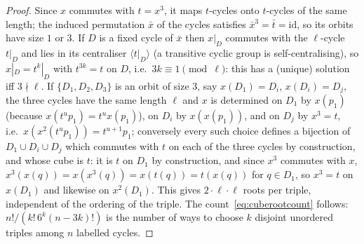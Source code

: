 \begin{proof}
Since $x$ commutes with $t=x^{3}$, it maps $t$-cycles onto $t$-cycles of the same length; the induced permutation $\bar x$ of the cycles satisfies $\bar x^{3}=\bar t=\mathrm{id}$, so its orbits have size $1$ or $3$.
If $D$ is a fixed cycle of $\bar x$ then $x|_D$ commutes with the $\ell$-cycle $t|_D$ and lies in its centraliser $\langle t|_D\rangle$ (a transitive cyclic group is self-centralising), so $x|_D=t^{k}|_D$ with $t^{3k}=t$ on $D$, i.e.\ $3k\equiv1\pmod\ell$: this has a (unique) solution iff $3\nmid\ell$.
If $\{D_1,D_2,D_3\}$ is an orbit of size $3$, say $x(D_1)=D_i$, $x(D_i)=D_j$, the three cycles have the same length $\ell$ and $x$ is determined on $D_1$ by $x(p_1)$ (because $x(t^{u}p_1)=t^{u}x(p_1)$), on $D_i$ by $x(x(p_1))$, and on $D_j$ by $x^{3}=t$, i.e.\ $x(x^{2}(t^{u}p_1))=t^{u+1}p_1$; conversely every such choice defines a bijection of $D_1\cup D_i\cup D_j$ which commutes with $t$ on each of the three cycles by construction, and whose cube is $t$: it is $t$ on $D_1$ by construction, and since $x^{3}$ commutes with $x$, $x^{3}(x(q))=x(x^{3}(q))=x(t(q))=t(x(q))$ for $q\in D_1$, so $x^{3}=t$ on $x(D_1)$ and likewise on $x^{2}(D_1)$. This gives $2\cdot\ell\cdot\ell$ roots per triple, independent of the ordering of the triple.
The count~\eqref{eq:cuberootcount} follows: $n!/(k!\,6^{k}(n-3k)!)$ is the number of ways to choose $k$ disjoint unordered triples among $n$ labelled cycles.
\end{proof}

